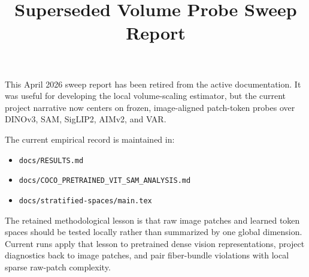 \documentclass{article}
\title{Superseded Volume Probe Sweep Report}
\date{}
\begin{document}
\maketitle

This April 2026 sweep report has been retired from the active documentation. It was useful for developing the local volume-scaling estimator, but the current project narrative now centers on frozen, image-aligned patch-token probes over DINOv3, SAM, SigLIP2, AIMv2, and VAR.

The current empirical record is maintained in:
\begin{itemize}
\item \texttt{docs/RESULTS.md}
\item \texttt{docs/COCO\_PRETRAINED\_VIT\_SAM\_ANALYSIS.md}
\item \texttt{docs/stratified-spaces/main.tex}
\end{itemize}

The retained methodological lesson is that raw image patches and learned token spaces should be tested locally rather than summarized by one global dimension. Current runs apply that lesson to pretrained dense vision representations, project diagnostics back to image patches, and pair fiber-bundle violations with local sparse raw-patch complexity.
\end{document}
